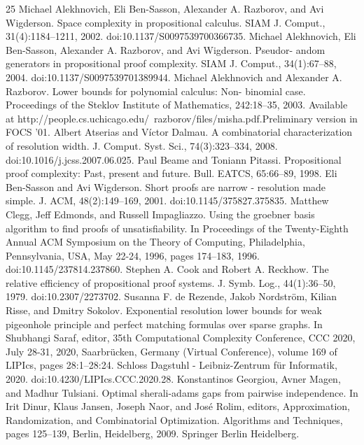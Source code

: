 \begin{thebibliography}{25}
 Michael Alekhnovich, Eli Ben-Sasson, Alexander A. Razborov, and Avi Wigderson. Space complexity in propositional calculus. SIAM J. Comput., 31(4):1184–1211, 2002. doi:10.1137/S0097539700366735.
 Michael Alekhnovich, Eli Ben-Sasson, Alexander A. Razborov, and Avi Wigderson. Pseudor- andom generators in propositional proof complexity. SIAM J. Comput., 34(1):67–88, 2004. doi:10.1137/S0097539701389944.
 Michael Alekhnovich and Alexander A. Razborov. Lower bounds for polynomial calculus: Non- binomial case. Proceedings of the Steklov Institute of Mathematics, 242:18–35, 2003. Available at http://people.cs.uchicago.edu/~razborov/files/misha.pdf.Preliminary version in FOCS ’01.
 Albert Atserias and Víctor Dalmau. A combinatorial characterization of resolution width. J. Comput. Syst. Sci., 74(3):323–334, 2008. doi:10.1016/j.jcss.2007.06.025.
 Paul Beame and Toniann Pitassi. Propositional proof complexity: Past, present and future. Bull. EATCS, 65:66–89, 1998.
 Eli Ben-Sasson and Avi Wigderson. Short proofs are narrow - resolution made simple. J. ACM, 48(2):149–169, 2001. doi:10.1145/375827.375835.
 Matthew Clegg, Jeff Edmonds, and Russell Impagliazzo. Using the groebner basis algorithm to find proofs of unsatisfiability. In Proceedings of the Twenty-Eighth Annual ACM Symposium on the Theory of Computing, Philadelphia, Pennsylvania, USA, May 22-24, 1996, pages 174–183, 1996. doi:10.1145/237814.237860.
 Stephen A. Cook and Robert A. Reckhow. The relative efficiency of propositional proof systems. J. Symb. Log., 44(1):36–50, 1979. doi:10.2307/2273702.
 Susanna F. de Rezende, Jakob Nordström, Kilian Risse, and Dmitry Sokolov. Exponential resolution lower bounds for weak pigeonhole principle and perfect matching formulas over sparse graphs. In Shubhangi Saraf, editor, 35th Computational Complexity Conference, CCC 2020, July 28-31, 2020, Saarbrücken, Germany (Virtual Conference), volume 169 of LIPIcs, pages 28:1–28:24. Schloss Dagstuhl - Leibniz-Zentrum für Informatik, 2020. doi:10.4230/LIPIcs.CCC.2020.28.
 Konstantinos Georgiou, Avner Magen, and Madhur Tulsiani. Optimal sherali-adams gaps from pairwise independence. In Irit Dinur, Klaus Jansen, Joseph Naor, and José Rolim, editors, Approximation, Randomization, and Combinatorial Optimization. Algorithms and Techniques, pages 125–139, Berlin, Heidelberg, 2009. Springer Berlin Heidelberg.

\end{thebibliography}
